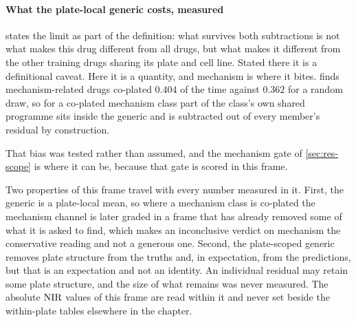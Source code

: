   \paragraph{What the plate-local generic costs, measured}
   states the limit as part of the definition: what
  survives both subtractions is not what makes this drug different from all drugs,
  but what makes it different from the other training drugs sharing its plate and
  cell line. Stated there it is a definitional caveat. Here it is a quantity, and
  mechanism is where it bites.  finds mechanism-related drugs
  co-plated $0.404$ of the time against $0.362$ for a random draw, so for a co-plated
  mechanism class part of the class's own shared programme sits inside the generic
  and is subtracted out of every member's residual by construction.
  
  That bias was tested rather than assumed, and the mechanism gate of
  \cref{sec:res-scope} is where it can be, because that gate is scored in this
  frame.

  \begin{scopelimit}
  Two properties of this frame travel with every number measured in it. First, the
  generic is a plate-local mean, so where a mechanism class is co-plated the
  mechanism channel is later graded in a frame that has already removed some of what
  it is asked to find, which makes an inconclusive verdict on mechanism the
  conservative reading and not a generous one. Second, the plate-scoped generic
  removes plate structure from the truths and, in expectation, from the predictions,
  but that is an expectation and not an identity. An individual residual may retain
  some plate structure, and the size of what remains was never measured. The absolute
  $\textrm{NIR}$ values of this frame are read within it and never set beside the
  within-plate tables elsewhere in the chapter.
  \end{scopelimit}
  
